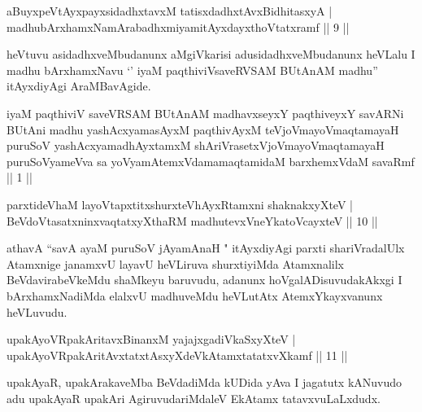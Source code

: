 
\begin{shl}
aBuyxpeVtAyxpayxsidadhxtavxM tatisxdadhxtAvxBidhitasxyA |\\
madhubArxhamxNamArabadhxmiyamitAyxdayxthoVtatxramf \hfill || 9 ||
\end{shl}

\begin{artha}
heVtuvu asidadhxveMbudanunx aMgiVkarisi adusidadhxveMbudanunx heVLalu I madhu bArxhamxNavu `' iyaM paqthiviVsaveRVSAM BUtAnAM madhu'' itAyxdiyAgi AraMBavAgide.
\end{artha}


\begin{kandikeshl}
iyaM paqthiviV saveVRSAM BUtAnAM madhavxseyxY paqthiveyxY savARNi BUtAni madhu yashAcxyamasAyxM paqthivAyxM teVjoVmayoV\s maqtamayaH puruSoV yashAcxyamadhAyxtamxM shAriVrasetxVjoVmayoV\s maqtamayaH puruSoV\s yameVva sa yoV\s yamAtemxVdamamaqtamidaM barxhemxVdaM savaRmf || 1 ||
\end{kandikeshl}



\begin{shl}
parxtideVhaM layoVtapxtitxshurxteVhAyxRtamxni shaknakxyXteV |\\
BeVdoV\s tasatxninxvaqtatxyXthaRM madhutevxVneYkatoVcayxteV \hfill || 10 ||
\end{shl}

\begin{artha}
athavA ``savA ayaM puruSoV jAyamAnaH " itAyxdiyAgi parxti shariVradalUlx Atamxnige janamxvU layavU heVLiruva shurxtiyiMda Atamxnalilx BeVdavirabeVkeMdu shaMkeyu baruvudu, adanunx hoVgalADisuvudakAkxgi I bArxhamxNadiMda elalxvU madhuveMdu heVLutAtx AtemxYkayxvanunx heVLuvudu.
\end{artha}


\begin{shl}
upakAyoVRpakAritavxBinanxM yajajxgadiVkaSxyXteV |\\
upakAyoVRpakAritAvxtatxtAsxyXdeVkAtamxtatatxvXkamf \hfill || 11 ||
\end{shl}

\begin{artha}
upakAyaR, upakArakaveMba BeVdadiMda kUDida yAva I jagatutx kANuvudo adu upakAyaR upakAri AgiruvudariMdaleV EkAtamx tatavxvuLaLxdudx.
\end{artha}


